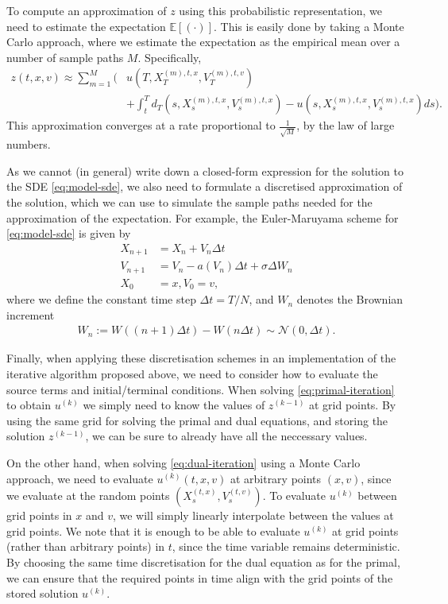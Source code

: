 \documentclass{article}  %
\begin{document}
To compute an approximation of $z$ using this probabilistic representation, we need to estimate the expectation $\mathbb{E}[(\cdot)]$. This is easily done by taking a Monte Carlo approach, where we estimate the expectation as the empirical mean over a number of sample paths $M$. Specifically,
%
\begin{align}
    \label{eq:dual-mc-approx}
    z(t,x,v) \approx \sum_{m=1}^{M} \Bigg( &u(T,X_T^{(m),t,x},V_T^{(m),t,v})\\
     &+ \int_t^T d_T(s,X_s^{(m),t,x},V_s^{(m),t,x}) - u(s,X_s^{(m),t,x},V_s^{(m),t,x}) ds \Bigg). 
\end{align}
%
This approximation converges at a rate proportional to $\frac{1}{\sqrt{M}}$, by the law of large numbers. 

As we cannot (in general) write down a closed-form expression for the solution to the SDE \autoref{eq:model-sde}, we also need to formulate a discretised approximation of the solution, which we can use to simulate the sample paths needed for the approximation of the expectation. For example, the Euler-Maruyama scheme for \autoref{eq:model-sde} is given by
%
\begin{align}
    X_{n+1} &= X_n + V_n \Delta t \\
    V_{n+1} &= V_n - a(V_n)\Delta t + \sigma \Delta W_n \\
    X_0 &= x, V_0 = v,
\end{align}
%
where we define the constant time step $\Delta t = T/N$, and $W_n$ denotes the Brownian increment
%
\begin{align} 
    W_n := W((n+1)\Delta t) - W(n\Delta t) \sim \mathcal{N}(0,\Delta t).
\end{align}
%

Finally, when applying these discretisation schemes in an implementation of the iterative algorithm proposed above, we need to consider how to evaluate the source terms and initial/terminal conditions. When solving \autoref{eq:primal-iteration} to obtain $u^{(k)}$ we simply need to know the values of $z^{(k-1)}$ at grid points. By using the same grid for solving the primal and dual equations, and storing the solution $z^{(k-1)}$, we can be sure to already have all the neccessary values.

On the other hand, when solving \autoref{eq:dual-iteration} using a Monte Carlo approach, we need to evaluate $u^{(k)}(t,x,v)$ at arbitrary points $(x,v)$, since we evaluate at the random points $(X_s^{(t,x)},V_s^{(t,v)})$. To evaluate $u^{(k)}$ between grid points in $x$ and $v$, we will simply linearly interpolate between the values at grid points.
We note that it is enough to be able to evaluate $u^{(k)}$ at grid points (rather than arbitrary points) in $t$, since the time variable remains deterministic. By choosing the same time discretisation for the dual equation as for the primal, we can ensure that the required points in time align with the grid points of the stored solution $u^{(k)}$. 
\end{document}
